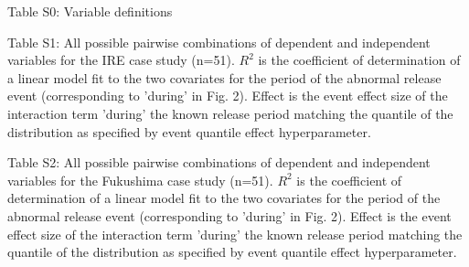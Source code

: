 \documentclass{article}
\begin{document}
\noindent Table S0: Variable definitions


\noindent Table S1: All possible pairwise combinations of dependent and independent variables for the IRE case study (n=51). $R^2$ is the coefficient of determination of a linear model fit to the two covariates for the period of the abnormal release event (corresponding to 'during' in Fig. 2). Effect is the event effect size of the interaction term 'during' the known release period matching the quantile of the distribution as specified by event quantile effect hyperparameter.



\noindent Table S2: All possible pairwise combinations of dependent and independent variables for the Fukushima case study (n=51). $R^2$ is the coefficient of determination of a linear model fit to the two covariates for the period of the abnormal release event (corresponding to 'during' in Fig. 2). Effect is the event effect size of the interaction term 'during' the known release period matching the quantile of the distribution as specified by event quantile effect hyperparameter.


\end{document}
